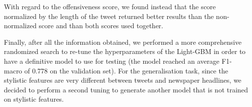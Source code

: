 With regard to the offensiveness score, we found instead that the score normalized by the length of the tweet returned better results than the non-normalized score and than both scores used together.

Finally, after all the information obtained, we performed a more comprehensive randomized search to re-tune the hyperparameters of the Light-GBM in order to have a definitive model to use for testing (the model reached an average F1-macro of 0.778 on the validation set). For the generalisation task, since the stylistic features are very different between tweets and newspaper headlines, we decided to perform a second tuning to generate another model that is not trained on stylistic features.